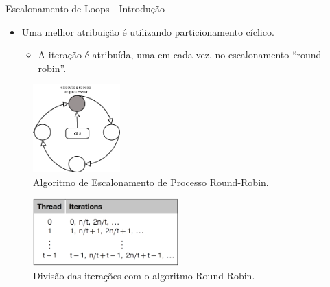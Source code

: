 	\begin{frame}{Escalonamento de Loops - Introdução}
		\begin{itemize}
			\item Uma melhor atribuição é utilizando particionamento cíclico.
			\begin{itemize}
				\item A iteração é atribuída, uma em cada vez, no escalonamento ``round-robin''.
			\end{itemize}
		\end{itemize}

		\begin{multicols}{2}
			\begin{figure}[p]
				\centering
				\includegraphics[width=0.3\textwidth]{img/pacheco/rr.png}
				\caption{Algoritmo de Escalonamento de Processo Round-Robin.}
			\end{figure}
		\columnbreak
			\begin{figure}[p]
				\centering
				\includegraphics[width=0.5\textwidth]{img/pacheco/rr-threads.png}
				\caption{Divisão das iterações com o algoritmo Round-Robin.}
			\end{figure}
		\end{multicols}
	\end{frame}

